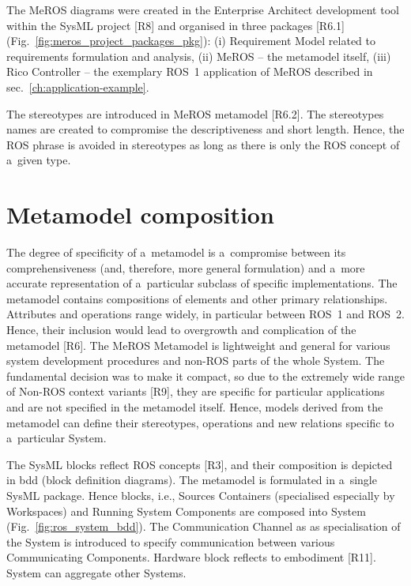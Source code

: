 \documentclass[11pt,oneside,a4paper]{report}
\begin{document}
	The MeROS diagrams were created in the Enterprise Architect development tool within the SysML project [R8] and organised in three packages [R6.1] (Fig.~\ref{fig:meros_project_packages_pkg}): (i) Requirement Model related to requirements formulation and analysis, (ii) MeROS -- the metamodel itself, (iii) Rico Controller -- the exemplary ROS~1 application of MeROS described in sec.~\ref{ch:application-example}. 
	
	
	
	The stereotypes are introduced in MeROS metamodel [R6.2].
	The stereotypes names are created to compromise the descriptiveness and short length. Hence, the ROS phrase is avoided in stereotypes as long as there is only the ROS concept of a~given type.
	
	
	
\section{Metamodel composition}
\label{sec:metamodel-composition}

	The degree of specificity of a~metamodel is a~compromise between its comprehensiveness (and, therefore, more general formulation) and a~more accurate representation of a~particular subclass of specific implementations. The metamodel contains compositions of elements and other primary relationships. Attributes and operations range widely, in particular between ROS~1 and ROS~2. Hence, their inclusion would lead to overgrowth and complication of the metamodel [R6]. The MeROS Metamodel is lightweight and general for various system development procedures and non-ROS parts of the whole System. The fundamental decision was to make it compact, so due to the extremely wide range of Non-ROS context variants [R9], they are specific for particular applications and are not specified in the metamodel itself.
	Hence, models derived from the metamodel can define their stereotypes, operations and new relations specific to a~particular System. 
	
	
	The SysML blocks reflect ROS concepts [R3], and their composition is depicted in bdd (block definition diagrams). The metamodel is formulated in a~single SysML package. Hence blocks, i.e., Sources Containers (specialised especially by Workspaces) and Running System Components are composed into System (Fig.~\ref{fig:ros_system_bdd}). The Communication Channel as as specialisation of the System is introduced to specify communication between various Communicating Components. Hardware block reflects to embodiment [R11]. System can aggregate other Systems.
	
\end{document}
